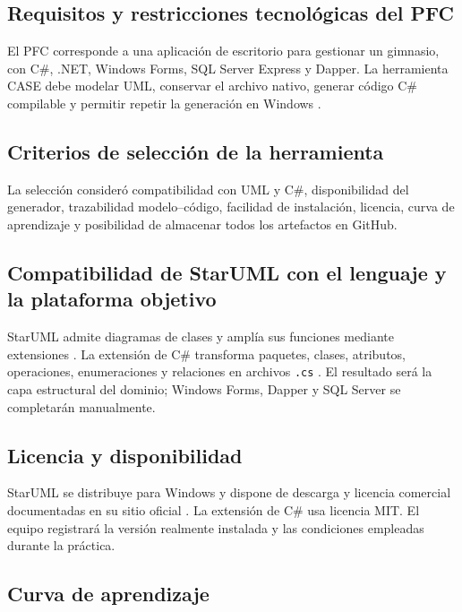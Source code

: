 \documentclass[12pt,a4paper]{article}
\begin{document}
\subsection{Requisitos y restricciones tecnológicas del PFC}

El PFC corresponde a una aplicación de escritorio para gestionar un gimnasio,
con C\#, .NET, Windows Forms, SQL Server Express y Dapper. La herramienta CASE
debe modelar UML, conservar el archivo nativo, generar código C\# compilable y
permitir repetir la generación en Windows \cite{microsoftCSharp2026}.

\subsection{Criterios de selección de la herramienta}

La selección consideró compatibilidad con UML y C\#, disponibilidad del
generador, trazabilidad modelo--código, facilidad de instalación, licencia,
curva de aprendizaje y posibilidad de almacenar todos los artefactos en
GitHub.

\subsection{Compatibilidad de StarUML con el lenguaje y la plataforma objetivo}

StarUML admite diagramas de clases y amplía sus funciones mediante extensiones
\cite{starumlOfficial2026}. La extensión de C\# transforma paquetes, clases,
atributos, operaciones, enumeraciones y relaciones en archivos
\texttt{.cs} \cite{starumlCSharp2025}. El resultado será la capa estructural
del dominio; Windows Forms, Dapper y SQL Server se completarán manualmente.

\subsection{Licencia y disponibilidad}

StarUML se distribuye para Windows y dispone de descarga y licencia comercial
documentadas en su sitio oficial \cite{starumlDownload2026,starumlPricing2026}.
La extensión de C\# usa licencia MIT. El equipo registrará la versión realmente
instalada y las condiciones empleadas durante la práctica.

\subsection{Curva de aprendizaje}
\end{document}
